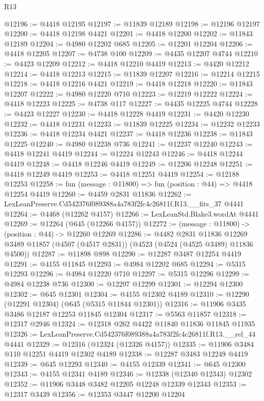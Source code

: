 \begin{lexlean}{R13}
\begin{coremodule}
@12196 := @4418 @12195
@12197 := @11839 @12189
@12198 := @12196 @12197
@12200 := @4418 @12198 @4421
@12201 := @4418 @12200
@12202 := @11843 @12189
@12204 := @4980 @12202 @685
@12205 := @12201 @12204
@12206 := @4418 @12205
@12207 := @4738 @100
@12209 := @4435 @12207 @4744
@12210 := @4423 @12209
@12212 := @4418 @12210 @4419
@12213 := @4420 @12212
@12214 := @4418 @12213
@12215 := @11839 @12207
@12216 := @12214 @12215
@12218 := @4418 @12216 @4421
@12219 := @4418 @12218
@12220 := @11843 @12207
@12222 := @4980 @12220 @710
@12223 := @12219 @12222
@12224 := @4418 @12223
@12225 := @4738 @117
@12227 := @4435 @12225 @4744
@12228 := @4423 @12227
@12230 := @4418 @12228 @4419
@12231 := @4420 @12230
@12232 := @4418 @12231
@12233 := @11839 @12225
@12234 := @12232 @12233
@12236 := @4418 @12234 @4421
@12237 := @4418 @12236
@12238 := @11843 @12225
@12240 := @4980 @12238 @736
@12241 := @12237 @12240
@12243 := @4418 @12241 @4419
@12244 := @12224 @12243
@12246 := @4418 @12244 @4419
@12248 := @4418 @12246 @4419
@12249 := @12206 @12248
@12251 := @4418 @12249 @4419
@12253 := @4418 @12251 @4419
@12254 := @12188 @12253
@12258 := fun (message : @11800) => fun (position : @44) => @4418 @12254 @4419
@12260 := @4459 @2831 @11836
@12262 := LexLeanPreserve.Cd542376f089388a4a783f2fc4c26811f.R13.__fits_37 @4441
@12264 := @4468 (@12262 @4157)
@12266 := LexLeanStd.Blake3.wordAt @4441
@12269 := @12264 (@645 (@12266 @4157))
@12272 := (message : @11800) -> (position : @44) -> @12260 @12269
@12286 := @4482
    @2831
    @11836
    @12269
    @3489
    @11857
    (@4507 (@4517 @2831))
    (@4523 (@4524 (@4525 @3489) @11836 @4500))
@12287 := @11898 @898
@12290 := @12287 @3487 @12254 @4419
@12291 := @4155 @11845
@12293 := @4984 @12202 @685
@12294 := @5315 @12293
@12296 := @4984 @12220 @710
@12297 := @5315 @12296
@12299 := @4984 @12238 @736
@12300 := @12297 @12299
@12301 := @12294 @12300
@12302 := @645 @12301
@12304 := @4155 @12302 @4189
@12310 := @12290 (@12291 @12304) (@645 (@5315 @11844 @12301))
@12316 := @11906 @3435 @3486 @12187 @12253 @11845 @12304
@12317 := @5563 @11857
@12318 := @12317 @2946
@12324 := @12318 @262 @4422 @11840 @11836 @11845 @11935
@12326 := LexLeanPreserve.Cd542376f089388a4a783f2fc4c26811f.R13.__rel_44 @4441
@12329 := @12316 (@12324 (@12326 @4157))
@12335 := @11906 @3484 @110 @12251 @4419 @12302 @4189
@12338 := @12287 @3483 @12249 @4419
@12339 := @645 @12293
@12340 := @4155 @12339
@12341 := @645 @12300
@12343 := @4155 @12341 @4189
@12346 := @12338 (@12340 @12343) @12302
@12352 := @11906 @3448 @3482 @12205 @12248 @12339 @12343
@12353 := @12317 @3439
@12356 := @12353 @3447 @12200 @12204

\end{coremodule}
\end{lexlean}

